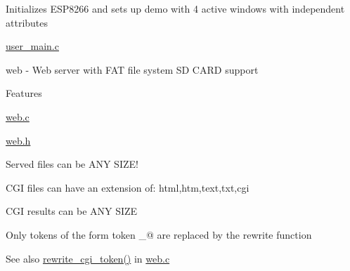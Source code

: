 \begin{DoxyItemize}
\begin{DoxyItemize}
\item Initializes E\+S\+P8266 and sets up demo with 4 active windows with independent attributes
\begin{DoxyItemize}
\item \hyperlink{user__main_8c}{user\+\_\+main.\+c}
\end{DoxyItemize}
\end{DoxyItemize}
\item web -\/ Web server with F\+AT file system SD C\+A\+RD support
\begin{DoxyItemize}
\item Features
\begin{DoxyItemize}
\item \hyperlink{web_8c}{web.\+c}
\item \hyperlink{web_8h}{web.\+h}
\end{DoxyItemize}
\item Served files can be A\+NY S\+I\+Z\+E!
\begin{DoxyItemize}
\item C\+GI files can have an extension of\+: html,htm,text,txt,cgi
\item C\+GI results can be A\+NY S\+I\+ZE
\end{DoxyItemize}
\item Only tokens of the form  token \+\_\+@ are replaced by the rewrite function
\begin{DoxyItemize}
\item \begin{DoxySeeAlso}{See also}
\hyperlink{web_8c_abfb5be0ab21dfe56bc934a8965154384}{rewrite\+\_\+cgi\+\_\+token()} in \hyperlink{web_8c}{web.\+c}
\end{DoxySeeAlso}


\end{DoxyItemize}
\end{DoxyItemize}
\end{DoxyItemize}
